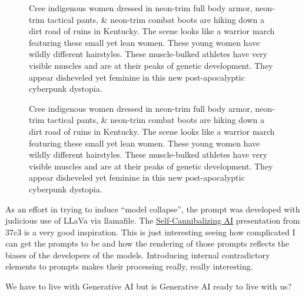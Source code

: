 \begin{figure}
\centering
{}
\caption{Cree indigenous women dressed in neon-trim full body armor,
neon-trim tactical pants, \& neon-trim combat boots are hiking down a
dirt road of ruins in Kentucky. The scene looks like a warrior march
featuring these small yet lean women. These young women have wildly
different hairstyles. These muscle-bulked athletes have very visible
muscles and are at their peaks of genetic development. They appear
disheveled yet feminine in this new post-apocalyptic cyberpunk
dystopia.}
\end{figure}

\begin{figure}
\centering
{}
\caption{Cree indigenous women dressed in neon-trim full body armor,
neon-trim tactical pants, \& neon-trim combat boots are hiking down a
dirt road of ruins in Kentucky. The scene looks like a warrior march
featuring these small yet lean women. These young women have wildly
different hairstyles. These muscle-bulked athletes have very visible
muscles and are at their peaks of genetic development. They appear
disheveled yet feminine in this new post-apocalyptic cyberpunk
dystopia.}
\end{figure}

As an effort in trying to induce ``model collapse'', the prompt was
developed with judicious use of LLaVa via llamafile. The
\href{https://media.ccc.de/v/37c3-12125-self-cannibalizing_ai}{Self-Cannibalizing
AI} presentation from 37c3 is a very good inspiration. This is just
interesting seeing how complicated I can get the prompts to be and how
the rendering of those prompts reflects the biases of the developers of
the models. Introducing internal contradictory elements to prompts makes
their processing really, really interesting.

We have to live with Generative AI but is Generative AI ready to live
with us?
